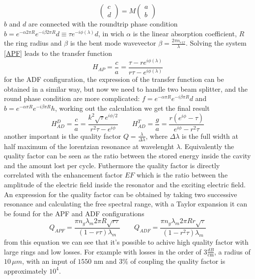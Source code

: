 \begin{equation}\label{APF}\begin{pmatrix}c \\ d \end{pmatrix} = M \begin{pmatrix}a\\b \end{pmatrix}\end{equation}
$b$ and $d$ are connected with the roundtrip phase condition $b = e^{-\alpha 2\pi R} e^{-i\beta 2\pi R}d \equiv\tau e^{-i\phi(\lambda)}d $, in wich $\alpha$ is the linear absorption coefficient, $R$ the ring radius and $\beta$ is the bent mode wavevector $\beta = \frac{2\pi n_{eff}}{\lambda}$. Solving the system \eqref{APF} leads to the transfer function
\begin{equation}H_{AP} = \frac{c}{a} = \frac{\tau - re^{i\phi(\lambda)}}{r\tau -e^{i\phi(\lambda)}}\end{equation}
for the ADF configuration, the expression of the transfer function can be obtained in a similar way, but now we need to handle two beam splitter, and the round phase condition are more complicated: $f = e^{-\alpha \pi R} e^{-i\beta \pi R}d$ and $b=e^{-\alpha \pi R} e^{-i\beta \pi R}h$, working out the calculation we get the final result
\begin{equation}H^D_{AD} = \frac{c}{a} = \frac{k^2\sqrt{\tau} e^{i\phi/2}}{r^2\tau -e^{i\phi}}\qquad H^T_{AD} = \frac{g}{a} = \frac{r(e^{i\phi} - \tau)}{e^{i\phi}-r^2\tau} \end{equation}
another important is the quality factor $Q = \frac{\lambda}{\Delta \lambda}$, where $\Delta \lambda$ is the full width at half maximum of the lorentzian resonance at wavelenght $\lambda$. Equivalently the quality factor can be seen as the ratio between the stored energy inside the cavity and the amount lost per cycle. Futhermore the quality factor is directly correlated with the enhancement factor $EF$ which is the ratio between the amplitude of the electric field inside the resonator and the exciting electric field. An expression for the quality factor can be obtained by taking two successive resonance and calculating the free spectral range, with a Taylor expansion it can be found \cite{thesis:borghi} for the APF and ADF configurations
\begin{equation}
Q_{APF} = \frac{\pi n_g \lambda_m 2\pi R \sqrt{r\tau}}{(1-r\tau)\lambda_m} \qquad Q_{ADF} = \frac{\pi n_g \lambda_m 2\pi R r\sqrt{\tau}}{(1-r^2\tau)\lambda_m}
\end{equation}
from this equation we can see that it's possible to achive high quality factor with large rings and low losses. For example with losses in the order of $3 \frac{dB}{\text{cm}}$, a radius of $10\, \mu m$, with an input of $1550$ nm and $3\%$ of coupling the quality factor is approximately $10^4$.
